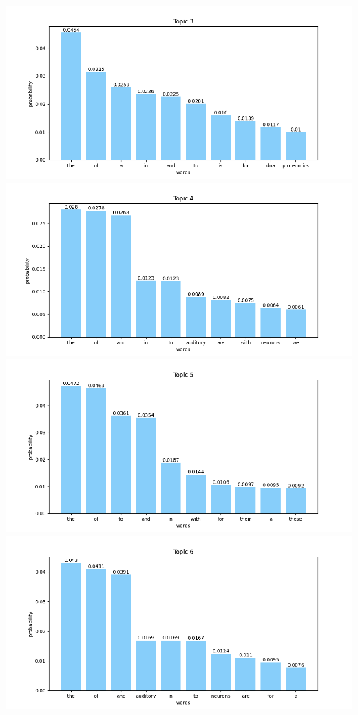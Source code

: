 \documentclass[10pt]{article} %
\begin{document}
\begin{center}
		\includegraphics[scale=0.6]{images/plots/test_8/topic_3.png}
		\includegraphics[scale=0.6]{images/plots/test_8/topic_4.png}\\
		\includegraphics[scale=0.6]{images/plots/test_8/topic_5.png}
		\includegraphics[scale=0.6]{images/plots/test_8/topic_6.png}

\end{center}
\end{document}
